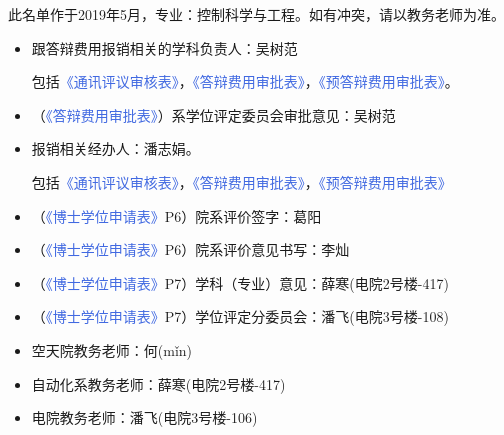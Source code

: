 \documentclass[a4paper, 12pt]{ctexart}
\newcommand{\form}[1]{\textcolor{RoyalBlue}{《#1》}}
\begin{document}
此名单作于2019年5月，专业：控制科学与工程。如有冲突，请以教务老师为准。
\begin{itemize}
    \item 跟答辩费用报销相关的学科负责人：吴树范
       
    包括\form{通讯评议审核表}，\form{答辩费用审批表}，\form{预答辩费用审批表}。
    \item （\form{答辩费用审批表}）系学位评定委员会审批意见：吴树范
    \item 报销相关经办人：潘志娟。
    
    包括\form{通讯评议审核表}，\form{答辩费用审批表}，\form{预答辩费用审批表}
    \item （\form{博士学位申请表}P6）院系评价签字：葛阳
    \item  （\form{博士学位申请表}P6）院系评价意见书写：李灿
    \item （\form{博士学位申请表}P7）学科（专业）意见：薛寒(电院2号楼-417)
    \item （\form{博士学位申请表}P7）学位评定分委员会：潘飞(电院3号楼-108)
    \item  空天院教务老师：何(mǐn)
    \item  自动化系教务老师：薛寒(电院2号楼-417)
    \item  电院教务老师：潘飞(电院3号楼-106)
\end{itemize}
\end{document}

